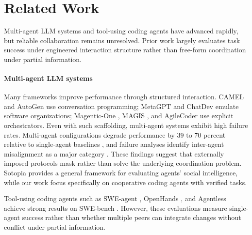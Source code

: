 \section{Related Work}

Multi-agent LLM systems and tool-using coding agents have advanced rapidly, but reliable collaboration remains unresolved. Prior work largely evaluates task success under engineered interaction structure rather than free-form coordination under partial information.
\vspace{-1em}
\paragraph{Multi-agent LLM systems}
Many frameworks improve performance through structured interaction. CAMEL \citep{li2023camel} and AutoGen \citep{wu2023autogen} use conversation programming; MetaGPT \citep{hong2024metagpt} and ChatDev \citep{qian2024chatdev} emulate software organizations; Magentic-One \citep{magnetic_one}, MAGIS \citep{tao2024magis}, and AgileCoder \citep{nguyen2024agilecoderdynamiccollaborativeagents} use explicit orchestrators. Even with such scaffolding, multi-agent systems exhibit high failure rates. Multi-agent configurations degrade performance by 39 to 70 percent relative to single-agent baselines \citep{chen2024scalingagents}, and failure analyses identify inter-agent misalignment as a major category \citep{cemri2025multiagentllmsystemsfail}. These findings suggest that externally imposed protocols mask rather than solve the underlying coordination problem. Sotopia \citep{zhou2024sotopia} provides a general framework for evaluating agents' social intelligence, while our work focus specifically on cooperative coding agents with verified tasks. 

Tool-using coding agents such as SWE-agent \citep{yang2024sweagent}, OpenHands \citep{wang2025openhands}, and Agentless \citep{xia2024agentless} achieve strong results on SWE-bench \citep{jimenez2024swebench}. However, these evaluations measure single-agent success rather than whether multiple peers can integrate changes without conflict under partial information.
\vspace{-1em}
